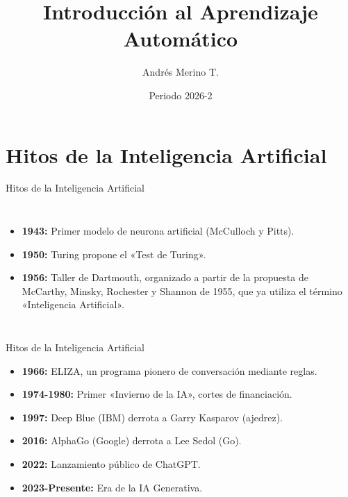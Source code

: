\documentclass[aspectratio=169]{beamer}
\title{Introducción al Aprendizaje Automático}
\author{Andrés Merino T.}
\institute{Aprendizaje Automático Inicial}
\date{Periodo 2026-2}
\begin{document}
\begin{frame}[plain]
\addtocounter{framenumber}{-1}
    \titlepage
\end{frame}



\section{Hitos de la Inteligencia Artificial}
\begin{frame}[t]{Hitos de la Inteligencia Artificial}
\begin{columns}
    \begin{itemize}[leftmargin=*]
        \item \textbf{1943:} Primer modelo de neurona artificial (McCulloch y Pitts).
        \item \textbf{1950:} Turing propone el «{Test de Turing}».
        \item \textbf{1956:} Taller de Dartmouth, organizado a partir de la propuesta de McCarthy, Minsky, Rochester y Shannon de 1955, que ya utiliza el término «Inteligencia Artificial».
    \end{itemize}
\end{columns}
\end{frame}
\begin{frame}[t]{Hitos de la Inteligencia Artificial}
    \begin{itemize}[leftmargin=*]
        \item \textbf{1966:} {ELIZA}, un programa pionero de conversación mediante reglas.
        \item \textbf{1974-1980:} Primer «{Invierno de la IA}», cortes de financiación.
        \item \textbf{1997:} Deep Blue (IBM) derrota a Garry Kasparov (ajedrez).
        \item \textbf{2016:} AlphaGo (Google) derrota a Lee Sedol (Go).
        \item \textbf{2022:} Lanzamiento público de ChatGPT.
        \item \textbf{2023-Presente:} Era de la IA Generativa.
    \end{itemize}
\end{frame}
\end{document}

